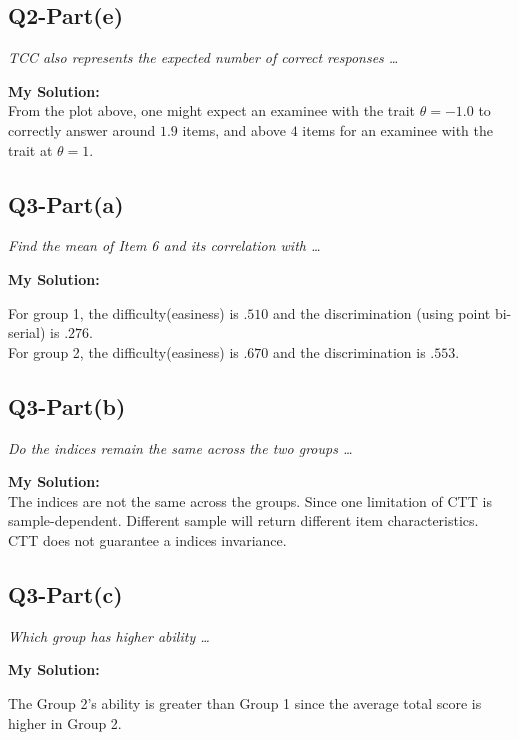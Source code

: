 \documentclass[
]{article}
\begin{document}
\hypertarget{q2-parte}{%
\subsection{Q2-Part(e)}\label{q2-parte}}

\emph{TCC also represents the expected number of correct responses
\ldots{}}

\textbf{My Solution: }\\
From the plot above, one might expect an examinee with the trait
\(\theta=-1.0\) to correctly answer around \(1.9\) items, and above
\(4\) items for an examinee with the trait at \(\theta=1\).

\hypertarget{q3-parta}{%
\subsection{Q3-Part(a)}\label{q3-parta}}

\emph{Find the mean of Item 6 and its correlation with \ldots{}}

\textbf{My Solution: }

For group 1, the difficulty(easiness) is \(.510\) and the discrimination
(using point bi-serial) is \(.276\).\\
For group 2, the difficulty(easiness) is \(.670\) and the discrimination
is \(.553\).

\hypertarget{q3-partb}{%
\subsection{Q3-Part(b)}\label{q3-partb}}

\emph{Do the indices remain the same across the two groups \ldots{}}

\textbf{My Solution: }\\
The indices are not the same across the groups. Since one limitation of
CTT is sample-dependent. Different sample will return different item
characteristics. CTT does not guarantee a indices invariance.

\hypertarget{q3-partc}{%
\subsection{Q3-Part(c)}\label{q3-partc}}

\emph{Which group has higher ability \ldots{}}

\textbf{My Solution: }

The Group 2's ability is greater than Group 1 since the average total
score is higher in Group 2.
\end{document}
